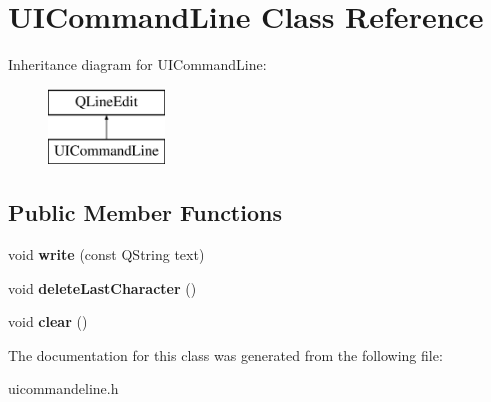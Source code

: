 \hypertarget{class_u_i_command_line}{}\section{U\+I\+Command\+Line Class Reference}
\label{class_u_i_command_line}
Inheritance diagram for U\+I\+Command\+Line\+:\begin{figure}[H]
\begin{center}
\leavevmode
\includegraphics[height=2.000000cm]{class_u_i_command_line}
\end{center}
\end{figure}
\subsection*{Public Member Functions}
\begin{DoxyCompactItemize}
\item 
void {\bfseries write} (const Q\+String text)\hypertarget{class_u_i_command_line_af6c0336c21b3b3a6a2b3b9970759fa88}{}\label{class_u_i_command_line_af6c0336c21b3b3a6a2b3b9970759fa88}

\item 
void {\bfseries delete\+Last\+Character} ()\hypertarget{class_u_i_command_line_ac3fd2096fa3e15952e0fafd4c932ca9b}{}\label{class_u_i_command_line_ac3fd2096fa3e15952e0fafd4c932ca9b}

\item 
void {\bfseries clear} ()\hypertarget{class_u_i_command_line_af9b2dc89dd92b99f13c2afed6ec9f352}{}\label{class_u_i_command_line_af9b2dc89dd92b99f13c2afed6ec9f352}

\end{DoxyCompactItemize}


The documentation for this class was generated from the following file\+:\begin{DoxyCompactItemize}
\item 
uicommandeline.\+h\end{DoxyCompactItemize}
